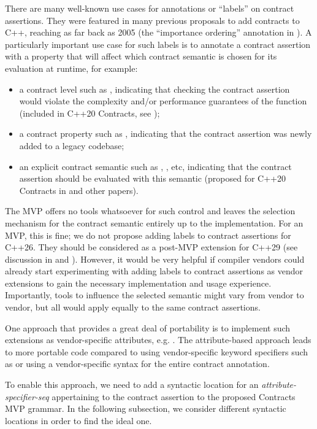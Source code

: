 There are many well-known use cases for annotations or ``labels'' on contract assertions. They were featured in many previous proposals to add contracts to C++, reaching as far back as 2005 (the ``importance ordering'' annotation in \cite{N1866}). A particularly important use case for such labels is to annotate a contract assertion with a property that will affect which contract semantic is chosen for its evaluation at runtime, for example:
\begin{itemize}
\item a contract level such as , indicating that checking the contract assertion would violate the complexity and/or performance guarantees of the function (included in C++20 Contracts, see \cite{P0542R5});
\item a contract property such as , indicating that the contract assertion was newly added to a legacy codebase;
\item an explicit contract semantic such as , , etc, indicating that the contract assertion should be evaluated with this semantic (proposed for C++20 Contracts in \cite{P1429R3} and other papers).
\end{itemize}
The MVP offers no tools whatsoever for such control and leaves the selection mechanism for the contract semantic entirely up to the implementation. For an MVP, this is fine; we do not propose adding labels to contract assertions for C++26. They should be considered as a post-MVP extension for C++29 (see discussion in \cite{P2755R0} and \cite{P2885R3}). However, it would be very helpful if compiler vendors could already start experimenting with adding labels to contract assertions as vendor extensions to gain the necessary implementation and usage experience.   Importantly, tools to influence the selected semantic might vary from vendor to vendor, but all would apply equally to the same contract assertions.

One approach that provides a great deal of portability is to implement such extensions as vendor-specific attributes, e.g. . The attribute-based approach leads to more portable code compared to using vendor-specific keyword specifiers such as  or using a vendor-specific syntax for the entire contract annotation.

To enable this approach, we need to add a syntactic location for an \emph{attribute-specifier-seq} appertaining to the contract assertion to the proposed Contracts MVP grammar. In the following subsection, we consider different syntactic locations in order to find the ideal one.

